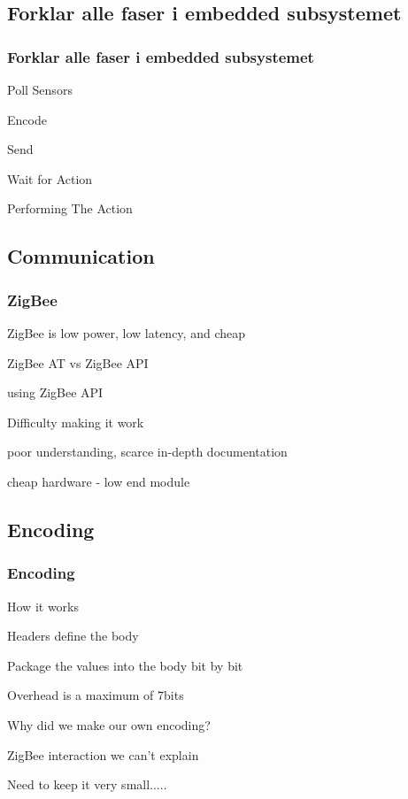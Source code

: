 \subsection{Forklar alle faser i embedded subsystemet}
\begin{frame}
	\frametitle{Forklar alle faser i embedded subsystemet}
	\begin{itemize}
		\item Poll Sensors
		\item Encode
		\item Send
		\item Wait for Action
		{\setlength\itemindent{20pt} \item Performing The Action}
	\end{itemize}
\end{frame}

\subsection{Communication}
\begin{frame}
	\frametitle{ZigBee}
	\begin{itemize}
		\item ZigBee is low power, low latency, and cheap
		\item ZigBee AT vs ZigBee API
		{\setlength\itemindent{20pt} \item using ZigBee API}
		\item Difficulty making it work
		{\setlength\itemindent{25pt} \item poor understanding, scarce in-depth documentation}
		{\setlength\itemindent{25pt} \item cheap hardware - low end module}
	\end{itemize}
\end{frame}

\subsection{Encoding}
\begin{frame}
	\frametitle{Encoding}
	\begin{itemize}
		\item How it works
		{\setlength\itemindent{25pt} \item Headers define the body}
		{\setlength\itemindent{25pt} \item Package the values into the body bit by bit}
		{\setlength\itemindent{25pt} \item Overhead is a maximum of 7bits}
		\item Why did we make our own encoding?
		{\setlength\itemindent{25pt} \item ZigBee interaction we can't explain}
		{\setlength\itemindent{25pt} \item Need to keep it very small.....}
	\end{itemize}
\end{frame}
